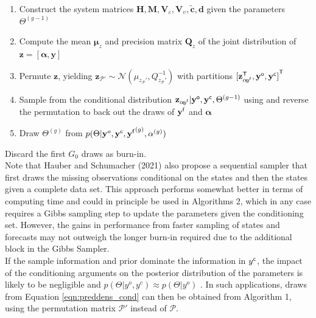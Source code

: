 \documentclass[notitlepage,a4paper,12pt]{article}
\newcommand{\transpose}[1]{{#1}^{\sf{T}}}
\begin{document}
\begin{enumerate}    
    \item Construct the system matrices $\mathbf{H}, \mathbf{M}, \mathbf{V}_{\!\varepsilon}, \mathbf{V}_{\!\upsilon}, \tilde{\mathbf{c}}, \mathbf{d}$ given the parameters $\Theta^{(g-1)}$
    \item Compute the mean $\boldsymbol{\mu}_{z}$ and precision matrix $\mathbf{Q}_{z}$ of the joint distribution of $\mathbf{z} = [\boldsymbol{\alpha}, \mathbf{y}]$  
    \item Permute $\mathbf{z}$, yielding $\mathbf{z}_{\mathcal{P}'} \sim \mathcal{N}(\mu_{z_\mathcal{P}'}, Q_{z_\mathcal{P}'}^{-1})$ with partitions $\transpose{[\mathbf{z}^{\sf{T}}_{\alpha\! y^{\sf{f}}}, \mathbf{y}^{\sf{o}}, \mathbf{y}^{\sf{c}}]}$
    \item Sample from the conditional distribution $\mathbf{z}_{\alpha\! y^{\sf{f}}} | \mathbf{y}^{\sf{o}}, \mathbf{y}^{\sf{c}}, \Theta^{(g-1)}$ using \citep[][Algorithm 2.1 and 2.4]{rueheld_2005} and reverse the permutation to back out the draws of $\mathbf{y}^{\sf{f}}$ and $\boldsymbol{\alpha}$
    \item Draw $\Theta^{(g)}$ from $p(\Theta|\mathbf{y}^o, \mathbf{y}^{\sf{c}}, {\mathbf{y}^{\sf{f}}}^{(g)}, \alpha^{(g)})$ 
 \end{enumerate}

 Discard the first $G_0$ draws as burn-in.\\

Note that Hauber and Schumacher (2021) also propose a sequential sampler that first draws the missing observations conditional on the states and then the states given a complete data set. This approach performs somewhat better in terms of computing time and could in principle be used in Algorithms 2, which in any case requires a Gibbs sampling step to update the parameters given the conditioning set. However, the gains in performance from faster sampling of states and forecasts may not outweigh the longer burn-in required due to the additional block in the Gibbs Sampler.\\

If the sample information and prior dominate the information in $y^{\sf{c}}$, the impact of the conditioning arguments on the posterior distribution of the parameters is likely to be negligible and $p(\Theta | y^o, y^c) \approx p(\Theta | y^o)$ \citep{delnegro_schorfheide_2013_hb,bgl_2015ijf}. In such applications, draws from Equation \ref{eqn:preddens_cond} can then be obtained from Algorithm 1, using the permutation matrix $\mathcal{P}'$ instead of $\mathcal{P}$.
\end{document}

